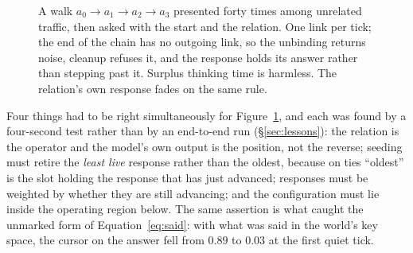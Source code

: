 \documentclass[11pt,a4paper]{article}
\theoremstyle{plain}
\theoremstyle{definition}
\theoremstyle{remark}
\begin{document}
\begin{figure}[h]
\centering
{}
\caption{A walk $a_0\!\to\!a_1\!\to\!a_2\!\to\!a_3$ presented forty times among
unrelated traffic, then asked with the start and the relation. One link per
tick; the end of the chain has no outgoing link, so the unbinding returns noise,
cleanup refuses it, and the response holds its answer rather than stepping past
it. Surplus thinking time is harmless. The relation's own response fades on the
same rule.}
\label{fig:walk}
\end{figure}

Four things had to be right simultaneously for Figure~\ref{fig:walk}, and each
was found by a four-second test rather than by an end-to-end run
(\S\ref{sec:lessons}): the relation is the operator and the model's own output is
the position, not the reverse; seeding must retire the \emph{least live}
response rather than the oldest, because on ties ``oldest'' is the slot holding
the response that has just advanced; responses must be weighted by whether they
are still advancing; and the configuration must lie inside the operating region
below. The same assertion is what caught the unmarked form of
Equation~\eqref{eq:said}: with what was said in the world's key space, the
cursor on the answer fell from $0.89$ to $0.03$ at the first quiet tick.
\end{document}
